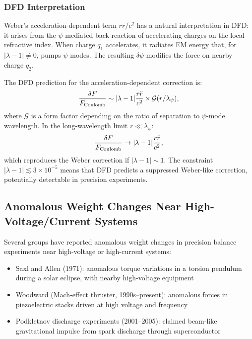 \documentclass[aps,prd,twocolumn,superscriptaddress,floatfix,nofootinbib]{revtex4-2}
\newcommand{\lam}{\lambda}
\begin{document}
\subsubsection{DFD Interpretation}

Weber's acceleration-dependent term $r\ddot{r}/c^2$ has a natural
interpretation in DFD: it arises from the $\psi$-mediated back-reaction
of accelerating charges on the local refractive index. When charge $q_1$
accelerates, it radiates EM energy that, for $|\lam-1| \neq 0$,
pumps $\psi$ modes. The resulting $\delta\psi$ modifies the force on
nearby charge $q_2$.

The DFD prediction for the acceleration-dependent correction is:
\begin{equation}
\frac{\delta F}{F_{\rm Coulomb}} \sim |\lam-1|\frac{r\ddot{r}}{c^2}
\times \mathcal{G}(r/\lambda_\psi),
\end{equation}
where $\mathcal{G}$ is a form factor depending on the ratio of separation
to $\psi$-mode wavelength. In the long-wavelength limit
$r \ll \lambda_\psi$:
\begin{equation}
\frac{\delta F}{F_{\rm Coulomb}} \to |\lam-1|\frac{r\ddot{r}}{c^2},
\end{equation}
which reproduces the Weber correction if $|\lam-1| \sim 1$. The
constraint $|\lam-1| \lesssim 3 \times 10^{-5}$ means that DFD
predicts a suppressed Weber-like correction, potentially detectable in
precision experiments.

\subsection{Anomalous Weight Changes Near High-Voltage/Current Systems}\label{sec:weight}

Several groups have reported anomalous weight changes in precision
balance experiments near high-voltage or high-current systems:
\begin{itemize}[nosep]
\item Saxl and Allen (1971): anomalous torque variations in a
torsion pendulum during a solar eclipse, with nearby high-voltage
equipment
\item Woodward (Mach-effect thruster, 1990s--present): anomalous
forces in piezoelectric stacks driven at high voltage and frequency
\item Podkletnov discharge experiments (2001--2005): claimed beam-like
gravitational impulse from spark discharge through superconductor
\end{itemize}
\end{document}
